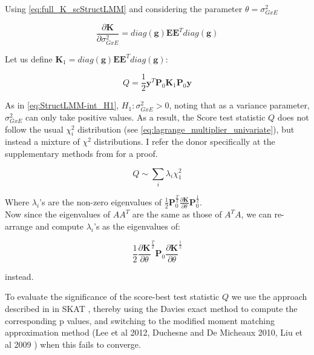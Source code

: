 Using \eqref{eq:full_K_scStructLMM} and considering the parameter $\theta = \sigma_{GxE}^2$

\begin{equation}
    \frac{\partial \mathbf{K}}{\partial \sigma_{GxE}^2} = diag(\mathbf{g})\mathbf{E}\mathbf{E}^Tdiag(\mathbf{g})
\end{equation}

Let us define $\mathbf{K}_1 = diag(\mathbf{g})\mathbf{E}\mathbf{E}^Tdiag(\mathbf{g})$:

\begin{equation}
    Q = \frac{1}{2}\mathbf{y}^T\mathbf{P}_0 \mathbf{K}_1\mathbf{P}_0 \mathbf{y} 
\end{equation}

As in \eqref{eq:StructLMM-int_H1}, $H_1: \sigma_{GxE}^2>0$, noting that as a variance parameter, $\sigma_{GxE}^2$ can only take positive values.
As a result, the Score test statistic $Q$ does not follow the usual $\chi^2_i$ distribution (see \eqref{eq:lagrange_multiplier_univariate}), but instead a mixture of  $\chi^2$ distributions.
I refer the donor specifically at the supplementary methods from \cite{lippert2014greater} for a proof.

\begin{equation}
    Q \sim \sum_i \lambda_i \chi^2_1 
\end{equation}

Where $\lambda_i$'s are the non-zero eigenvalues of $\frac{1}{2}\mathbf{P}_0^{\frac{T}{2}} \frac{\partial\mathbf{K}}{\partial \theta} \mathbf{P}_0^{\frac{1}{2}}$.\\

Now since the eigenvalues of $AA^T$ are the same as those of $A^TA$, we can re-arrange and compute $\lambda_i$'s as the eigenvalues of:

\begin{equation}
    \frac{1}{2}\frac{\partial\mathbf{K}}{\partial \theta}^{\frac{T}{2}} \mathbf{P}_0 \frac{\partial\mathbf{K}}{\partial \theta}^{\frac{1}{2}}
\end{equation}

instead.

To evaluate the significance of the score-best test statistic $Q$ we use the approach described in in SKAT \cite{wu2011rare}, thereby using the Davies exact method \cite{davies1980algorithm} to compute the corresponding p values, and switching to the modified moment matching approximation method (Lee et al 2012, Duchesne and De Micheaux 2010, Liu et al 2009 \cite{liu2009new, lee2012optimal}) when this fails to converge.


